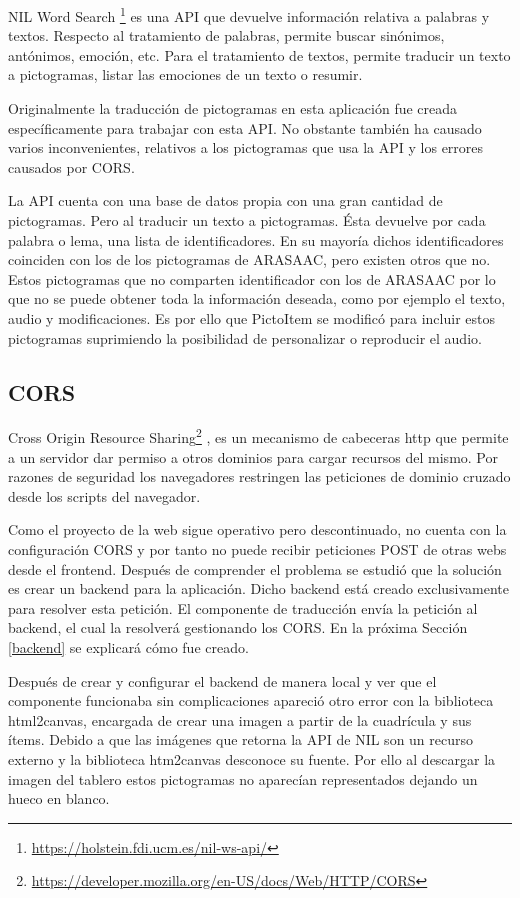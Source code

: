 NIL Word Search \footnote{\url{https://holstein.fdi.ucm.es/nil-ws-api/}} es una API que devuelve información relativa a palabras y textos. Respecto al tratamiento de palabras, permite buscar sinónimos, antónimos, emoción, etc. Para el tratamiento de textos, permite  traducir un texto a pictogramas, listar las emociones de un texto o resumir. 

Originalmente la traducción de pictogramas en esta aplicación fue creada específicamente para trabajar con esta API. No obstante también ha causado varios inconvenientes, relativos a los pictogramas que usa la API y los errores causados por CORS. 

La API cuenta con una base de datos propia con una gran cantidad de pictogramas. Pero al traducir un texto a pictogramas. Ésta devuelve por cada palabra o lema, una lista de identificadores. En su mayoría dichos identificadores coinciden con los de los pictogramas de ARASAAC, pero existen otros que no. Estos pictogramas que no comparten identificador con los de ARASAAC por lo que no se puede obtener toda la información deseada, como por ejemplo el texto, audio y modificaciones. Es por ello que PictoItem se modificó para incluir estos pictogramas suprimiendo la posibilidad de personalizar o reproducir el audio.


\subsection{CORS}

Cross Origin Resource Sharing\footnote{\url{https://developer.mozilla.org/en-US/docs/Web/HTTP/CORS}}  , es un mecanismo de cabeceras http que permite a un servidor dar permiso a otros dominios para cargar recursos del mismo. Por razones de seguridad los navegadores restringen las peticiones de dominio cruzado desde los scripts del navegador. 


Como el proyecto de la web sigue operativo pero descontinuado, no cuenta con la configuración CORS y por tanto no puede recibir peticiones POST de otras webs desde el frontend. Después de comprender el problema se estudió que la solución es crear un backend para la aplicación. Dicho backend está creado exclusivamente para resolver esta petición. El componente de traducción envía la petición al backend, el cual la resolverá gestionando los CORS. En la próxima Sección \ref{backend} se explicará cómo fue creado. 


Después de crear y configurar el backend de manera local y ver que el componente funcionaba sin complicaciones apareció otro error con la biblioteca html2canvas, encargada de crear una imagen a partir de la cuadrícula y sus ítems. Debido a que las imágenes que retorna la API de NIL son un recurso externo y la biblioteca htm2canvas desconoce su fuente. Por ello al descargar la imagen del tablero estos pictogramas no aparecían representados dejando un hueco en blanco.

